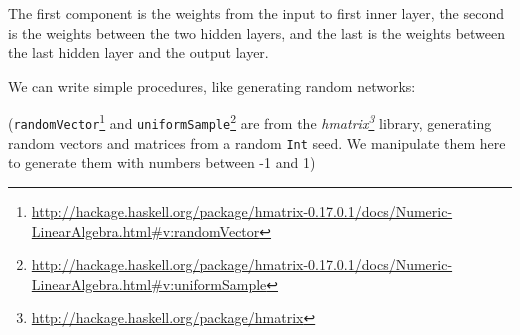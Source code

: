 \documentclass[]{article}
\newenvironment{Shaded}{}{}
\newcommand{\KeywordTok}[1]{\textcolor[rgb]{0.00,0.44,0.13}{\textbf{{#1}}}}
\newcommand{\DataTypeTok}[1]{\textcolor[rgb]{0.56,0.13,0.00}{{#1}}}
\newcommand{\DecValTok}[1]{\textcolor[rgb]{0.25,0.63,0.44}{{#1}}}
\newcommand{\CommentTok}[1]{\textcolor[rgb]{0.38,0.63,0.69}{\textit{{#1}}}}
\newcommand{\OtherTok}[1]{\textcolor[rgb]{0.00,0.44,0.13}{{#1}}}
\newcommand{\FunctionTok}[1]{\textcolor[rgb]{0.02,0.16,0.49}{{#1}}}
\newcommand{\NormalTok}[1]{{#1}}
\renewcommand{\href}[2]{#2\footnote{\url{#1}}}
\begin{document}
The first component is the weights from the input to first inner layer,
the second is the weights between the two hidden layers, and the last is
the weights between the last hidden layer and the output layer.

We can write simple procedures, like generating random networks:

\begin{Shaded}
\end{Shaded}

(\href{http://hackage.haskell.org/package/hmatrix-0.17.0.1/docs/Numeric-LinearAlgebra.html\#v:randomVector}{\texttt{randomVector}}
and
\href{http://hackage.haskell.org/package/hmatrix-0.17.0.1/docs/Numeric-LinearAlgebra.html\#v:uniformSample}{\texttt{uniformSample}}
are from the
\emph{\href{http://hackage.haskell.org/package/hmatrix}{hmatrix}}
library, generating random vectors and matrices from a random
\texttt{Int} seed. We manipulate them here to generate them with numbers
between -1 and 1)
\end{document}
